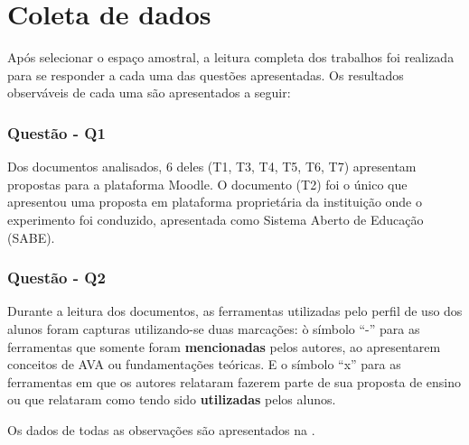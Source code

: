 \section{Coleta de dados}%

Após selecionar o espaço amostral, a leitura completa dos trabalhos foi realizada para se responder a cada uma das questões apresentadas. Os resultados observáveis de cada uma são apresentados a seguir:

\subsubsection{Questão - Q1}
Dos documentos analisados, 6 deles (T1, T3, T4, T5, T6, T7) apresentam propostas para a plataforma Moodle. O documento (T2) foi o único que apresentou uma proposta em plataforma proprietária da instituição onde o experimento foi conduzido, apresentada como Sistema Aberto de Educação (SABE).


\subsubsection{Questão - Q2}
Durante a leitura dos documentos, as ferramentas utilizadas pelo perfil de uso dos alunos foram capturas utilizando-se duas marcações: ò símbolo ``-'' para as ferramentas que somente foram \textbf{mencionadas} pelos autores, ao apresentarem conceitos de AVA ou fundamentações teóricas. E o símbolo ``x'' para as ferramentas em que os autores relataram fazerem parte de sua proposta de ensino ou que relataram como tendo sido \textbf{utilizadas} pelos alunos.

Os dados de todas as observações são apresentados na .

